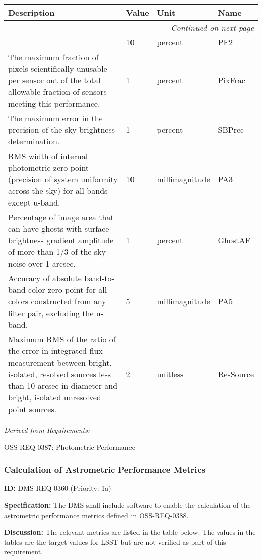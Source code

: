 \documentclass[SE,toc,lsstdraft]{lsstdoc}
\makeatletter
\newcommand{\paramname}[1]{\hspace{0pt}#1}
\newcommand{\unitname}[1]{\hspace{0pt}#1}
\newenvironment{parameters}[0]{%
\setlength\LTleft{0pt}
\setlength\LTright{\fill}
\begin{small}
\begin{longtable}[]{|p{0.49\textwidth}|l|p{0.6in}|p{1.70in}@{}|}

\hline \textbf{Description} & \textbf{Value} & \textbf{Unit} & \textbf{Name} \\ \hline
\endhead

\hline \multicolumn{4}{r}{\emph{Continued on next page}} \\
\endfoot

\hline\hline
\endlastfoot
}{%
\hline
\end{longtable}
\end{small}
}
\makeatother
\begin{document}
\begin{parameters}
&
10
&
\unitname{%
percent
}
&
\paramname{%
PF2
} \\\hline
The maximum fraction of pixels scientifically unusable per sensor out of the total allowable fraction of sensors meeting this performance.
&
1
&
\unitname{%
percent
}
&
\paramname{%
PixFrac
} \\\hline
The maximum error in the precision of the sky brightness determination.

&
1
&
\unitname{%
percent
}
&
\paramname{%
SBPrec
} \\\hline
RMS width of internal photometric zero-point (precision of system uniformity across the sky) for all bands except u-band.

&
10
&
\unitname{%
millimagnitude
}
&
\paramname{%
PA3
} \\\hline
Percentage of image area that can have ghosts with surface brightness gradient amplitude of more than 1/3 of the sky noise over 1 arcsec.

&
1
&
\unitname{%
percent
}
&
\paramname{%
GhostAF
} \\\hline
Accuracy of absolute band-to-band color zero-point for all colors constructed from any filter pair, excluding the u-band.
&
5
&
\unitname{%
millimagnitude
}
&
\paramname{%
PA5
} \\\hline
Maximum RMS of the ratio of the error in integrated flux measurement between bright, isolated, resolved sources less than 10 arcsec in diameter and bright, isolated unresolved point sources.
&
2
&
\unitname{%
unitless
}
&
\paramname{%
ResSource
} \\\hline
\end{parameters}

\emph{Derived from Requirements:}

OSS-REQ-0387:
Photometric Performance \newline

\subsubsection{Calculation of Astrometric Performance Metrics}

\label{DMS-REQ-0360}
\textbf{ID:} DMS-REQ-0360 (Priority: 1a)

\textbf{Specification:}
The DMS shall include software to enable the calculation of the astrometric performance metrics defined in OSS-REQ-0388.

\textbf{Discussion:}
The relevant metrics are listed in the table below. The values in the tables are the target values for LSST but are not verified as part of this requirement.
\end{document}
